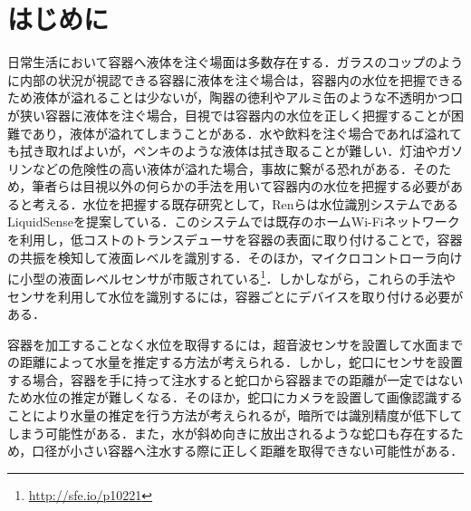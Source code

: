 \documentclass[submit,techrep,noauthor]{ipsj}
\begin{document}
\maketitle

\section{はじめに}
日常生活において容器へ液体を注ぐ場面は多数存在する．ガラスのコップのように内部の状況が視認できる容器に液体を注ぐ場合は，容器内の水位を把握できるため液体が溢れることは少ないが，陶器の徳利やアルミ缶のような不透明かつ口が狭い容器に液体を注ぐ場合，目視では容器内の水位を正しく把握することが困難であり，液体が溢れてしまうことがある．水や飲料を注ぐ場合であれば溢れても拭き取ればよいが，ペンキのような液体は拭き取ることが難しい．灯油やガソリンなどの危険性の高い液体が溢れた場合，事故に繋がる恐れがある．そのため，筆者らは目視以外の何らかの手法を用いて容器内の水位を把握する必要があると考える．水位を把握する既存研究として，Renら\cite{LiquidSense}は水位識別システムであるLiquidSenseを提案している．このシステムでは既存のホームWi-Fiネットワークを利用し，低コストのトランスデューサを容器の表面に取り付けることで，容器の共振を検知して液面レベルを識別する．そのほか，マイクロコントローラ向けに小型の液面レベルセンサが市販されている\footnote{\url{http://sfe.io/p10221}}．しかしながら，これらの手法やセンサを利用して水位を識別するには，容器ごとにデバイスを取り付ける必要がある．\par

容器を加工することなく水位を取得するには，超音波センサを設置して水面までの距離によって水量を推定する方法\cite{smart_faucet1}が考えられる．しかし，蛇口にセンサを設置する場合，容器を手に持って注水すると蛇口から容器までの距離が一定ではないため水位の推定が難しくなる．そのほか，蛇口にカメラを設置して画像認識することにより水量の推定を行う方法が考えられるが，暗所では識別精度が低下してしまう可能性がある．また，水が斜め向きに放出されるような蛇口も存在するため，口径が小さい容器へ注水する際に正しく距離を取得できない可能性がある．\par
\end{document}
